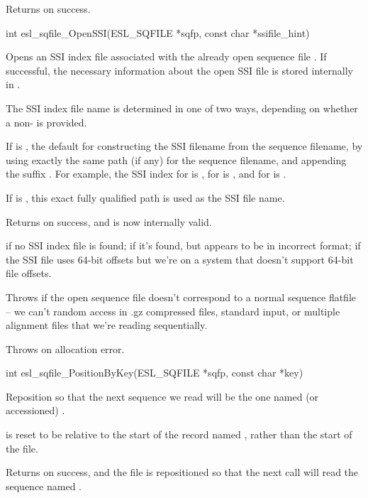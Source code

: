 \begin{sreapi}
Returns  on success.


\hypertarget{func:esl_sqfile_OpenSSI()}
{\item[int esl\_sqfile\_OpenSSI(ESL\_SQFILE *sqfp, const char *ssifile\_hint)]}

Opens an SSI index file associated with the already open
sequence file . If successful, the necessary
information about the open SSI file is stored internally
in .

The SSI index file name is determined in one of two
ways, depending on whether a non- 
is provided.

If  is , the default for
constructing the SSI filename from the sequence
filename, by using exactly the same path (if any) for
the sequence filename, and appending the suffix .
For example, the SSI index for  is , for
 is , and for
 is .

If  is , this exact fully
qualified path is used as the SSI file name.

Returns  on success, and  is now internally
valid.

 if no SSI index file is found;
 if it's found, but appears to be in incorrect format;
 if the SSI file uses 64-bit offsets but we're on
a system that doesn't support 64-bit file offsets.

Throws  if the open sequence file  doesn't
correspond to a normal sequence flatfile -- we can't
random access in .gz compressed files, standard input,
or multiple alignment files that we're reading
sequentially.

Throws  on allocation error.


\hypertarget{func:esl_sqfile_PositionByKey()}
{\item[int esl\_sqfile\_PositionByKey(ESL\_SQFILE *sqfp, const char *key)]}

Reposition  so that the next sequence we read will
be the one named (or accessioned) .

 is reset to be relative to the start
of the record named , rather than the start of the
file.

Returns  on success, and the file  is repositioned
so that the next  call will read the
sequence named .


\end{sreapi}
